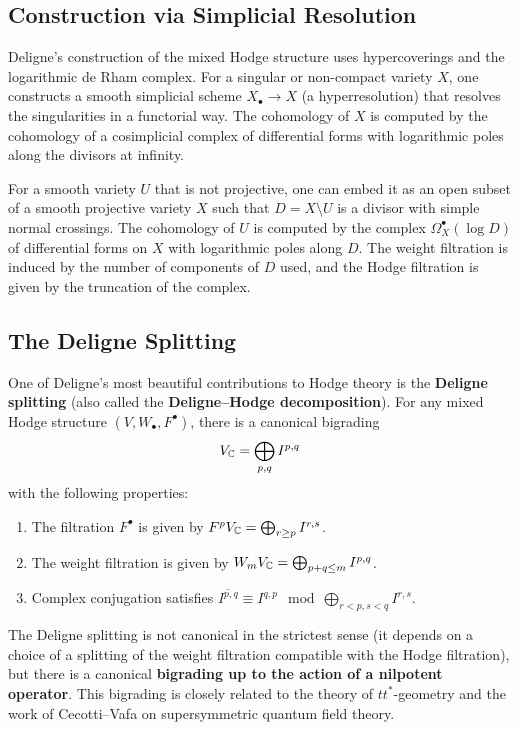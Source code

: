 \subsection{Construction via Simplicial Resolution}

Deligne's construction of the mixed Hodge structure uses hypercoverings and the logarithmic de Rham complex. For a singular or non-compact variety \(X\), one constructs a smooth simplicial scheme \(X_\bullet \to X\) (a hyperresolution) that resolves the singularities in a functorial way. The cohomology of \(X\) is computed by the cohomology of a cosimplicial complex of differential forms with logarithmic poles along the divisors at infinity.

For a smooth variety \(U\) that is not projective, one can embed it as an open subset of a smooth projective variety \(X\) such that \(D = X \setminus U\) is a divisor with simple normal crossings. The cohomology of \(U\) is computed by the complex \(\Omega_X^\bullet(\log D)\) of differential forms on \(X\) with logarithmic poles along \(D\). The weight filtration is induced by the number of components of \(D\) used, and the Hodge filtration is given by the truncation of the complex.

\subsection{The Deligne Splitting}

One of Deligne's most beautiful contributions to Hodge theory is the \textbf{Deligne splitting} (also called the \textbf{Deligne--Hodge decomposition}). For any mixed Hodge structure \((V, W_\bullet, F^\bullet)\), there is a canonical bigrading
\[
V_{\mathbb{C}} = \bigoplus_{p,q} I^{p,q}
\]
with the following properties:
\begin{enumerate}
    \item The filtration \(F^\bullet\) is given by \(F^p V_{\mathbb{C}} = \bigoplus_{r \geq p} I^{r,s}\).
    \item The weight filtration is given by \(W_m V_{\mathbb{C}} = \bigoplus_{p+q \leq m} I^{p,q}\).
    \item Complex conjugation satisfies \(\overline{I^{p,q}} \equiv I^{q,p} \mod \bigoplus_{r < p, s < q} I^{r,s}\).
\end{enumerate}

The Deligne splitting is not canonical in the strictest sense (it depends on a choice of a splitting of the weight filtration compatible with the Hodge filtration), but there is a canonical \textbf{bigrading up to the action of a nilpotent operator}. This bigrading is closely related to the theory of \(tt^*\)-geometry and the work of Cecotti--Vafa on supersymmetric quantum field theory.

